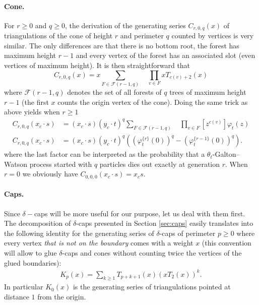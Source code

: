 \documentclass[10pt]{amsart}
\theoremstyle{definition}\newtheorem{defi}[theo]{Definition}\newtheorem{rema}[theo]{Remark}\newtheorem{exam}[theo]{Example}\newtheorem{exem}[theo]{Example}\newtheorem{nota}[theo]{Notation}
\begin{document}
\paragraph{Cone.} For $r\geq 0$ and $q\geq 0$, the derivation of the generating series $C_{r,0,q}(x)$ of triangulations of the cone of height $r$ and perimeter $q$ counted by vertices is very similar. The only differences are that there is no bottom root, the forest has maximum height $r-1$ and every vertex of the forest has an associated slot (even vertices of maximum height). It is then straightforward that
\[
C_{r,0,q}(x) = x \sum_{F \in \mathcal{F}(r-1,q)} \quad \prod_{v \in F} x T_{c(v)+2}(x)
\]
where $\mathcal{F}(r-1,q)$ denotes the set of all forests of $q$ trees of maximum height $r-1$ (the first $x$ counts the origin vertex of the cone). Doing the same trick as above yields when $r \geq 1$
\begin{align}
C_{r,0,q}(x_c \cdot s)
&= (x_c \cdot s) (y_c \cdot t)^{q} \sum_{F \in \mathcal{F}(r-1,q)} \quad \prod_{v \in F}
\left[ z^{c(v)}  \right]\varphi_t(z)\nonumber \\
\label{eq:gencone}
C_{r,0,q}(x_c \cdot s) &=
(x_c \cdot s) (y_c \cdot t)^{q}
\left( \left(\varphi_t^{\{r\}} (0) \right)^q - \left(\varphi_t^{\{r-1\}} (0) \right)^q \right).
\end{align}
where the last factor can be interpreted as the probability that a $\theta_{t}$-Galton--Watson process started with $q$ particles dies out exactly at generation $r$. When $r=0$ we obviously have $C_{0,0,0}(x_c \cdot s) = x_{c}  s$.

\paragraph{Caps.} Since $\delta-$caps will be more useful for our purpose, let us deal with them first.
The decomposition of $\delta$-caps presented in Section \ref{sec:caps} easily translates into the following identity for the generating series of $\delta$-caps of perimeter $p \geq 0$ where every vertex \emph{that is not on the boundary} comes with a weight $x$ (this convention will allow to glue $\delta$-caps and cones without counting twice the vertices of the glued boundaries):
\begin{align}
\label{eq:crowngs}
K_p(x) =
\sum_{k \geq 1} T_{p+k+1} (x) \left( xT_2(x) \right)^k.
\end{align}
In particular $K_{0}(x)$ is the generating series of triangulations pointed at distance $1$ from the origin.
\end{document}
